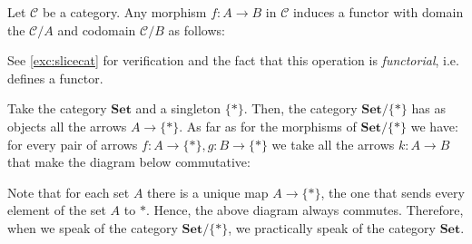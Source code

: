 \documentclass[11pt]{article}
\theoremstyle{plain}
\theoremstyle{definition}
\theoremstyle{remark}
\newcommand{\cC}{\mathcal{C}}
\begin{document}
\begin{note}\label{slice:func}
Let $\cC$ be a category. Any morphism $f:A \rightarrow B$ in $\cC$ induces a
functor with domain the $\cC/A$ and codomain $\cC/B$ as follows:
\begin{figure}[h]
    \centering
{}
\end{figure}
See \autoref{exc:slicecat} for verification and the fact that this operation
is {\em functorial}, i.e. defines a functor.
\end{note}

\begin{example}
Take the category $\textbf{Set}$ and a singleton $\{*\}$. Then, the category
$\textbf{Set}/\{*\}$ has as objects all the arrows $A \rightarrow \{*\}$.
As far as for the morphisms of $\textbf{Set}/\{*\}$ we have: for every pair
of arrows $f:A\rightarrow \{*\},g:B \rightarrow \{*\}$ we take all the
arrows $k:A \rightarrow B$ that make the diagram below commutative:
\begin{figure}[H]
\centering
{}
\end{figure}

Note that for each set $A$ there is a unique map $A\to \{*\}$, the one that
sends every element of the set $A$ to $*$. Hence, the above diagram always 
commutes. Therefore, when we speak of the category $\textbf{Set}/\{*\}$,
we practically speak of the category $\textbf{Set}$.
\end{example}
\end{document}
